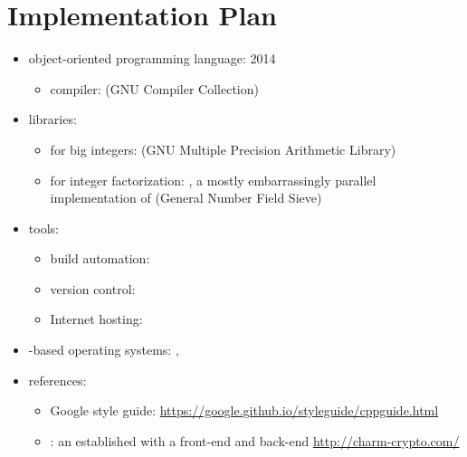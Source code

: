 \section{Implementation Plan}


\begin{itemize}
\item object-oriented programming language:  2014
  \begin{itemize}
  \item compiler:  (GNU Compiler Collection)
  \end{itemize}
\item libraries:
  \begin{itemize}
  \item for big integers: 
    (GNU Multiple Precision Arithmetic Library)
  \item for integer factorization: ,
    a mostly embarrassingly parallel
    implementation of 
    (General Number Field Sieve)
  \end{itemize}
\item tools:
  \begin{itemize}
  \item build automation: 
  \item version control: 
  \item \gihub{} Internet hosting: \crygithub
  \end{itemize}
\item {}-based operating systems:
  , 
\item references:
\begin{itemize}
\item Google  style guide:
    \url{https://google.github.io/styleguide/cppguide.html}
\item {}: an established \cf{} with a  front-end and  back-end
  \url{http://charm-crypto.com/}
\end{itemize}
\end{itemize}
